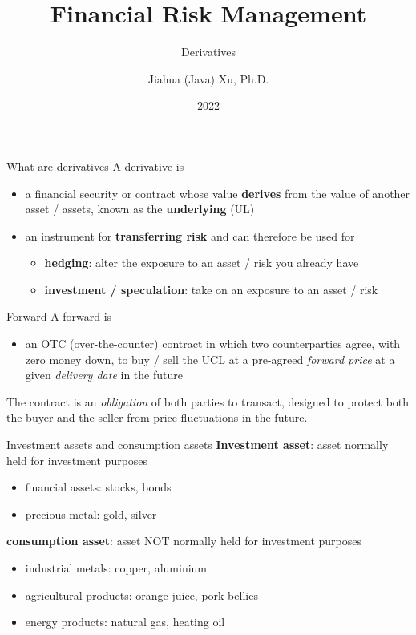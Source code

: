 \documentclass[
  ignorenonframetext,
  aspectratio=169]{beamer}
\title{Financial Risk Management}
\subtitle{Derivatives}
\author{Jiahua (Java) Xu, Ph.D.}
\date{2022}
\providecommand{\tightlist}{%
  \setlength{\itemsep}{0pt}\setlength{\parskip}{0pt}}
\begin{document}
\frame{\titlepage}

\begin{frame}{What are derivatives}
\protect\hypertarget{what-are-derivatives}{}
A derivative is

\begin{itemize}
\tightlist
\item
  a financial security or contract whose value \textbf{derives} from the
  value of another asset / assets, known as the \textbf{underlying} (UL)
\item
  an instrument for \textbf{transferring risk} and can therefore be used
  for

  \begin{itemize}
  \tightlist
  \item
    \textbf{hedging}: alter the exposure to an asset / risk you already
    have
  \item
    \textbf{investment / speculation}: take on an exposure to an asset /
    risk
  \end{itemize}
\end{itemize}
\end{frame}

\begin{frame}{Forward}
\protect\hypertarget{forward}{}
A forward is

\begin{itemize}
\tightlist
\item
  an OTC (over-the-counter) contract in which two counterparties agree,
  with zero money down, to buy / sell the UCL at a pre-agreed
  \emph{forward price} at a given \emph{delivery date} in the future
\end{itemize}

The contract is an \emph{obligation} of both parties to transact,
designed to protect both the buyer and the seller from price
fluctuations in the future.
\end{frame}

\begin{frame}{Investment assets and consumption assets}
\protect\hypertarget{investment-assets-and-consumption-assets}{}
\textbf{Investment asset}: asset normally held for investment purposes

\begin{itemize}
\tightlist
\item
  financial assets: stocks, bonds
\item
  precious metal: gold, silver
\end{itemize}

\textbf{consumption asset}: asset NOT normally held for investment
purposes

\begin{itemize}
\tightlist
\item
  industrial metals: copper, aluminium
\item
  agricultural products: orange juice, pork bellies
\item
  energy products: natural gas, heating oil
\end{itemize}
\end{frame}
\end{document}
